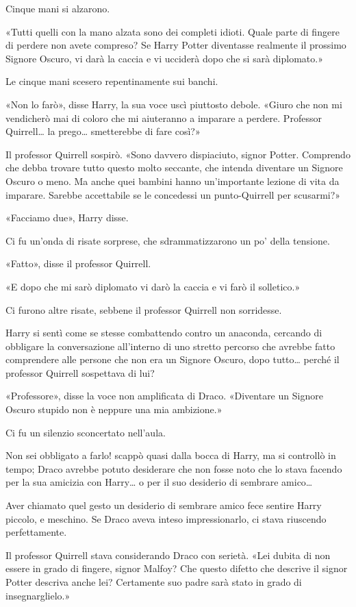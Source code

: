 Cinque mani si alzarono.

«Tutti quelli con la mano alzata sono dei completi idioti. Quale parte di fingere di perdere non avete compreso? Se Harry Potter diventasse realmente il prossimo Signore Oscuro, vi darà la caccia e vi ucciderà dopo che si sarà diplomato.»

Le cinque mani scesero repentinamente sui banchi.

«Non lo farò», disse Harry, la sua voce uscì piuttosto debole. «Giuro che non mi vendicherò mai di coloro che mi aiuteranno a imparare a perdere. Professor Quirrell… la prego… smetterebbe di fare così?»

Il professor Quirrell sospirò. «Sono davvero dispiaciuto, signor Potter. Comprendo che debba trovare tutto questo molto seccante, che intenda diventare un Signore Oscuro o meno. Ma anche quei bambini hanno un’importante lezione di vita da imparare. Sarebbe accettabile se le concedessi un punto-Quirrell per scusarmi?»

«Facciamo due», Harry disse.

Ci fu un’onda di risate sorprese, che sdrammatizzarono un po’ della tensione.

«Fatto», disse il professor Quirrell.

«E dopo che mi sarò diplomato vi darò la caccia e vi farò il solletico.»

Ci furono altre risate, sebbene il professor Quirrell non sorridesse.

Harry si sentì come se stesse combattendo contro un anaconda, cercando di obbligare la conversazione all’interno di uno stretto percorso che avrebbe fatto comprendere alle persone che non era un Signore Oscuro, dopo tutto… perché il professor Quirrell sospettava di lui?

«Professore», disse la voce non amplificata di Draco. «Diventare un Signore Oscuro stupido non è neppure una mia ambizione.»

Ci fu un silenzio sconcertato nell’aula.

Non sei obbligato a farlo! scappò quasi dalla bocca di Harry, ma si controllò in tempo; Draco avrebbe potuto desiderare che non fosse noto che lo stava facendo per la sua amicizia con Harry… o per il suo desiderio di sembrare amico…

Aver chiamato quel gesto un desiderio di sembrare amico fece sentire Harry piccolo, e meschino. Se Draco aveva inteso impressionarlo, ci stava riuscendo perfettamente.

Il professor Quirrell stava considerando Draco con serietà. «Lei dubita di non essere in grado di fingere, signor Malfoy? Che questo difetto che descrive il signor Potter descriva anche lei? Certamente suo padre sarà stato in grado di insegnarglielo.»

